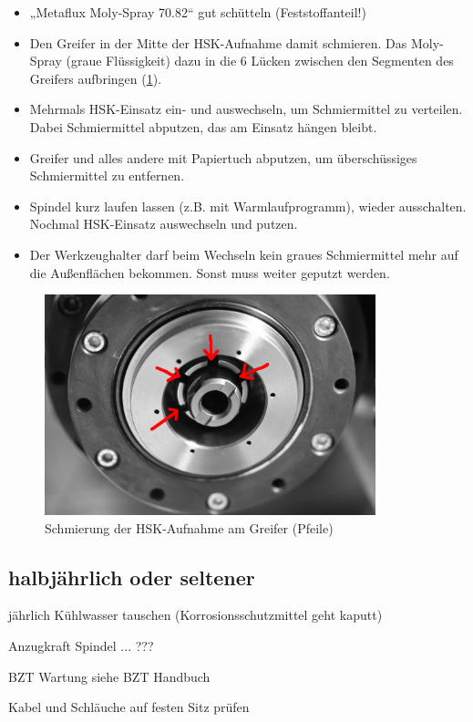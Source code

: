 \documentclass{\basedir/fablab-document}
\begin{document}
\begin{itemize}
	\item „Metaflux Moly-Spray 70.82“ gut schütteln (Feststoffanteil!)
	\item Den Greifer in der Mitte der HSK-Aufnahme damit schmieren. Das Moly-Spray (graue Flüssigkeit) dazu in die 6 Lücken zwischen den Segmenten des Greifers aufbringen (\cref{fig:hsk-greifer}). 
	\item Mehrmals HSK-Einsatz ein- und auswechseln, um Schmiermittel zu verteilen. Dabei Schmiermittel abputzen, das am Einsatz hängen bleibt.
	\item Greifer und alles andere mit Papiertuch abputzen, um überschüssiges Schmiermittel zu entfernen.
	\item Spindel kurz laufen lassen (z.B. mit Warmlaufprogramm), wieder ausschalten. Nochmal HSK-Einsatz auswechseln und putzen.
	\item Der Werkzeughalter darf beim Wechseln kein graues Schmiermittel mehr auf die Außenflächen bekommen. Sonst muss weiter geputzt werden.
\end{itemize}

\begin{figure}[hb]
\centering
\includegraphics[height=6.4cm]{./img/hsk-aufnahme-segmente.jpg}
\caption{Schmierung der HSK-Aufnahme am Greifer (Pfeile)}
\label{fig:hsk-greifer}
\end{figure}

\subsection{halbjährlich oder seltener}
jährlich Kühlwasser tauschen (Korrosionsschutzmittel geht kaputt)

Anzugkraft Spindel ... ???

BZT Wartung siehe BZT Handbuch

Kabel und Schläuche auf festen Sitz prüfen
\end{document}
